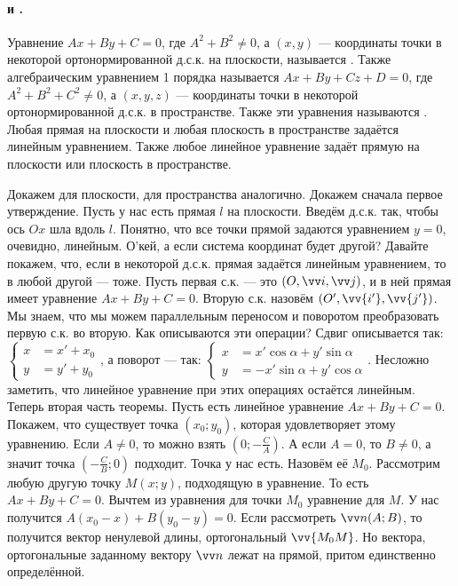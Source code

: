 \documentclass{article}
\let\vec\vv
\begin{document}
    \paragraph{ и .}
    \begin{itemize}
        \dfn Уравнение $Ax+By+C=0$, где $A^2+B^2\neq 0$, а $(x,y)$ --- координаты точки в некоторой ортонормированной д.с.к. на плоскости, называется . Также алгебраическим уравнением 1 порядка называется $Ax+By+Cz+D=0$, где $A^2+B^2+C^2\neq 0$, а $(x,y,z)$ --- координаты точки в некоторой ортонормированной д.с.к. в пространстве. Также эти уравнения называются .
        \thm Любая прямая на плоскости и любая плоскость в пространстве задаётся линейным уравнением. Также любое линейное уравнение задаёт прямую на плоскости или плоскость в пространстве.
        \begin{Proof}
            Докажем для плоскости, для пространства аналогично. Докажем сначала первое утверждение. Пусть у нас есть прямая $l$ на плоскости. Введём д.с.к. так, чтобы ось $Ox$ шла вдоль $l$. Понятно, что все точки прямой задаются уравнением $y=0$, очевидно, линейным. О'кей, а если система координат будет другой? Давайте покажем, что, если в некоторой д.с.к. прямая задаётся линейным уравнением, то в любой другой --- тоже. Пусть первая с.к. --- это $(O,\vec i,\vec j)$, и в ней прямая имеет уравнение $Ax+By+C=0$. Вторую с.к. назовём $(O',\vec{i'},\vec{j'})$. Мы знаем, что мы можем параллельным переносом и поворотом преобразовать первую с.к. во вторую. Как описываются эти операции? Сдвиг описывается так: $\left\{\begin{aligned}
                x&=x'+x_0\\
                y&=y'+y_0
            \end{aligned}\right.$, а поворот --- так: $\left\{\begin{aligned}
                x&=x'\cos\alpha+y'\sin\alpha\\
                y&=-x'\sin\alpha+y'\cos\alpha
            \end{aligned}\right.$. Несложно заметить, что линейное уравнение при этих операциях остаётся линейным.\\
            Теперь вторая часть теоремы. Пусть есть линейное уравнение $Ax+By+C=0$. Покажем, что существует точка $(x_0;y_0)$, которая удовлетворяет этому уравнению. Если $A\neq0$, то можно взять $\left(0;-\frac CA\right)$. А если $A=0$, то $B\neq0$, а значит точка $\left(-\frac CB;0\right)$ подходит. Точка у нас есть. Назовём её $M_0$. Рассмотрим любую другую точку $M(x;y)$, подходящую в уравнение. То есть $Ax+By+C=0$. Вычтем из уравнения для точки $M_0$ уравнение для $M$. У нас получится $A(x_0-x)+B(y_0-y)=0$. Если рассмотреть $\vec n(A;B)$, то получится вектор ненулевой длины, ортогональный $\vec{M_0M}$. Но вектора, ортогональные заданному вектору $\vec n$ лежат на прямой, притом единственно определённой.

\end{Proof}
\end{itemize}
\end{document}
